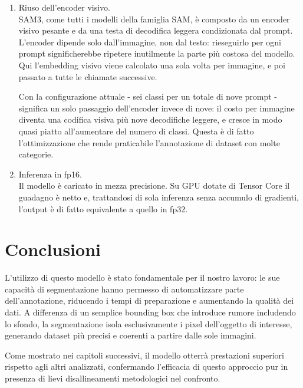 \begin{enumerate}
	\item Riuso dell'encoder visivo. \\
	SAM3, come tutti i modelli della famiglia SAM, è composto da un encoder visivo pesante e da una testa di decodifica leggera condizionata dal prompt.
	L'encoder dipende solo dall'immagine, non dal testo: rieseguirlo per ogni prompt significherebbe ripetere inutilmente la parte più costosa del modello.
	Qui l'embedding visivo viene calcolato una sola volta per immagine, e poi passato a tutte le chiamate successive.
	
	Con la configurazione attuale - sei classi per un totale di nove prompt - significa un solo passaggio dell'encoder invece di nove:
	il costo per immagine diventa una codifica visiva più nove decodifiche leggere, e cresce in modo quasi piatto all'aumentare del numero di classi.
	Questa è di fatto l'ottimizzazione che rende praticabile l'annotazione di dataset con molte categorie.
	
	\item Inferenza in fp16. \\
	Il modello è caricato in mezza precisione. Su GPU dotate di Tensor Core il guadagno è netto e, trattandosi di sola inferenza senza accumulo di gradienti, l'output è di fatto equivalente a quello in fp32.
\end{enumerate}

\section{Conclusioni}

L'utilizzo di questo modello è stato fondamentale per il nostro lavoro:
le sue capacità di segmentazione hanno permesso di automatizzare parte dell'annotazione, riducendo i tempi di preparazione e aumentando la qualità dei dati.
A differenza di un semplice bounding box che introduce rumore includendo lo sfondo, la segmentazione isola esclusivamente i pixel dell'oggetto di interesse,
generando dataset più precisi e coerenti a partire dalle sole immagini.

Come mostrato nei capitoli successivi, il modello otterrà prestazioni superiori rispetto agli altri analizzati,
confermando l'efficacia di questo approccio pur in presenza di lievi disallineamenti metodologici nel confronto.
